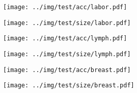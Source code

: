 \begin{figure}[h]
\centering
\begin{subfigure}[b]{0.45\textwidth}
\texttt{[image: ../img/test/acc/labor.pdf]}
\caption{}
\end{subfigure}
\qquad
\begin{subfigure}[b]{0.45\textwidth}
\texttt{[image: ../img/test/size/labor.pdf]}
\caption{}
\end{subfigure}
\caption{}
\end{figure}

\begin{figure}[h]
\centering
\begin{subfigure}[b]{0.45\textwidth}
\texttt{[image: ../img/test/acc/lymph.pdf]}
\caption{}
\end{subfigure}
\qquad
\begin{subfigure}[b]{0.45\textwidth}
\texttt{[image: ../img/test/size/lymph.pdf]}
\caption{}
\end{subfigure}
\caption{}
\end{figure}

\begin{figure}[h]
\centering
\begin{subfigure}[b]{0.45\textwidth}
\texttt{[image: ../img/test/acc/breast.pdf]}
\caption{}
\end{subfigure}
\qquad
\begin{subfigure}[b]{0.45\textwidth}
\texttt{[image: ../img/test/size/breast.pdf]}
\caption{}
\end{subfigure}
\caption{}
\end{figure}

